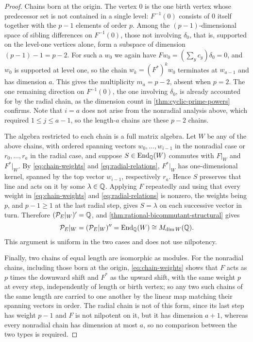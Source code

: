 \begin{proof}
Chains born at the origin.  The vertex \(0\) is the one birth vertex
whose predecessor set is not contained in a single level: \(F^{-1}(0)\)
consists of \(0\) itself together with the \(p-1\) elements of order \(p\).
Among the \((p-1)\)-dimensional space of sibling differences on \(F^{-1}(0)\),
those not involving \(\delta_0\), that is, supported on the level-one
vertices alone, form a subspace of dimension \((p-1)-1=p-2\).  For such a
\(w_0\) we again have \(Fw_0=(\sum_yc_y)\delta_0=0\), and \(w_0\) is supported
at level one, so the chain \(w_k=(F^*)^kw_0\) terminates at \(w_{a-1}\) and has
dimension \(a\).  This gives the multiplicity \(m_a=p-2\), absent when
\(p=2\).  The one remaining direction on \(F^{-1}(0)\), the one involving
\(\delta_0\), is already accounted for by the radial chain, as the dimension
count in \cref{thm:cyclic-prime-powers} confirms.  Note that \(i=a\) does not
arise from the nonradial analysis above, which required \(1\leq j\leq a-1\), so
the length-\(a\) chains are these \(p-2\) chains.

The algebra restricted to each chain is a full matrix algebra.  Let \(W\) be any of the
above chains, with ordered spanning vectors \(w_0,\ldots,w_{i-1}\) in the
nonradial case or \(r_0,\ldots,r_a\) in the radial case, and suppose
\(S\in\operatorname{End}_\mathbb Q(W)\) commutes with \(F|_W\) and \(F^*|_W\).  By
\eqref{eq:chain-weights} and \eqref{eq:radial-relations}, \(F^*|_W\) has
one-dimensional kernel, spanned by the top vector \(w_{i-1}\), respectively
\(r_a\).  Hence \(S\) preserves that line and acts on it by some
\(\lambda\in\mathbb Q\).  Applying \(F\) repeatedly and using that every weight in
\eqref{eq:chain-weights} and \eqref{eq:radial-relations} is nonzero, the
weights being \(p\), and \(p-1\geq1\) at the last radial step, gives
\(S=\lambda\) on each successive vector in turn.  Therefore
\((\mathcal P_E|_W)'=\mathbb Q\), and
\cref{thm:rational-bicommutant-structural} gives
\[
 \mathcal P_E|_W=(\mathcal P_E|_W)''=\operatorname{End}_\mathbb Q(W)\cong M_{\dim W}(\mathbb Q).
\]
This argument is uniform in the two cases and does not use nilpotency.

Finally, two chains of equal length are isomorphic as modules.  For the
nonradial chains, including those born at the origin,
\eqref{eq:chain-weights} shows that \(F\) acts as \(p\) times the downward
shift and \(F^*\) as the upward shift, with the same weight \(p\) at every
step, independently of length or birth vertex; so any two such chains of the
same length are carried to one another by the linear map matching their
spanning vectors in order.  The radial chain is not of this form, since its
last step has weight \(p-1\) and \(F\) is not nilpotent on it, but it has
dimension \(a+1\), whereas every nonradial chain has dimension at most \(a\),
so no comparison between the two types is required.
\end{proof}

